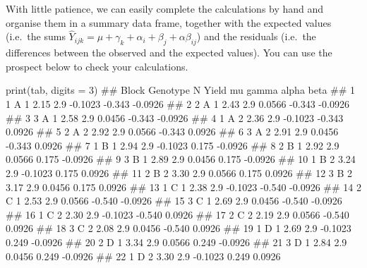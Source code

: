\documentclass[a4paper,12pt,oneside]{book}
\newenvironment{Shaded}{\begin{snugshade}}{\end{snugshade}}
\newcommand{\DecValTok}[1]{#1}
\newcommand{\DocumentationTok}[1]{#1}
\newcommand{\FunctionTok}[1]{#1}
\newcommand{\AttributeTok}[1]{#1}
\newcommand{\NormalTok}[1]{#1}
\begin{document}
With little patience, we can easily complete the calculations by hand and organise them in a summary data frame, together with the expected values (i.e.~the sums \(\hat{Y}_{ijk} = \mu + \gamma_k + \alpha_i + \beta_j + \alpha\beta_{ij}\)) and the residuals (i.e.~the differences between the observed and the expected values). You can use the prospect below to check your calculations.

\vspace{12pt}
\scriptsize

\vspace{12pt}

\begin{Shaded}
\begin{Highlighting}[]
\FunctionTok{print}\NormalTok{(tab, }\AttributeTok{digits =} \DecValTok{3}\NormalTok{)}
\DocumentationTok{\#\#    Block Genotype N Yield  mu   gamma  alpha    beta}
\DocumentationTok{\#\# 1      1        A 1  2.15 2.9 {-}0.1023 {-}0.343 {-}0.0926}
\DocumentationTok{\#\# 2      2        A 1  2.43 2.9  0.0566 {-}0.343 {-}0.0926}
\DocumentationTok{\#\# 3      3        A 1  2.58 2.9  0.0456 {-}0.343 {-}0.0926}
\DocumentationTok{\#\# 4      1        A 2  2.36 2.9 {-}0.1023 {-}0.343  0.0926}
\DocumentationTok{\#\# 5      2        A 2  2.92 2.9  0.0566 {-}0.343  0.0926}
\DocumentationTok{\#\# 6      3        A 2  2.91 2.9  0.0456 {-}0.343  0.0926}
\DocumentationTok{\#\# 7      1        B 1  2.94 2.9 {-}0.1023  0.175 {-}0.0926}
\DocumentationTok{\#\# 8      2        B 1  2.92 2.9  0.0566  0.175 {-}0.0926}
\DocumentationTok{\#\# 9      3        B 1  2.89 2.9  0.0456  0.175 {-}0.0926}
\DocumentationTok{\#\# 10     1        B 2  3.24 2.9 {-}0.1023  0.175  0.0926}
\DocumentationTok{\#\# 11     2        B 2  3.30 2.9  0.0566  0.175  0.0926}
\DocumentationTok{\#\# 12     3        B 2  3.17 2.9  0.0456  0.175  0.0926}
\DocumentationTok{\#\# 13     1        C 1  2.38 2.9 {-}0.1023 {-}0.540 {-}0.0926}
\DocumentationTok{\#\# 14     2        C 1  2.53 2.9  0.0566 {-}0.540 {-}0.0926}
\DocumentationTok{\#\# 15     3        C 1  2.69 2.9  0.0456 {-}0.540 {-}0.0926}
\DocumentationTok{\#\# 16     1        C 2  2.30 2.9 {-}0.1023 {-}0.540  0.0926}
\DocumentationTok{\#\# 17     2        C 2  2.19 2.9  0.0566 {-}0.540  0.0926}
\DocumentationTok{\#\# 18     3        C 2  2.08 2.9  0.0456 {-}0.540  0.0926}
\DocumentationTok{\#\# 19     1        D 1  2.69 2.9 {-}0.1023  0.249 {-}0.0926}
\DocumentationTok{\#\# 20     2        D 1  3.34 2.9  0.0566  0.249 {-}0.0926}
\DocumentationTok{\#\# 21     3        D 1  2.84 2.9  0.0456  0.249 {-}0.0926}
\DocumentationTok{\#\# 22     1        D 2  3.30 2.9 {-}0.1023  0.249  0.0926}

\end{Highlighting}
\end{Shaded}
\end{document}
